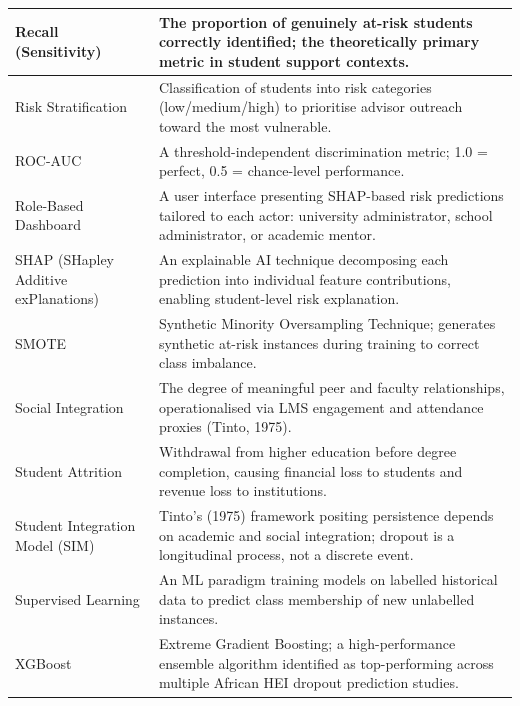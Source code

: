 \documentclass[12pt]{report}
\begin{document}
\begin{center}
\begin{longtable}{|L{3.8cm}|L{10cm}|}
 Recall (Sensitivity) & The proportion of genuinely at-risk students correctly identified; the theoretically primary metric in student support contexts. \\ \hline
{} Risk Stratification & Classification of students into risk categories (low/medium/high) to prioritise advisor outreach toward the most vulnerable. \\ \hline
{} ROC-AUC & A threshold-independent discrimination metric; 1.0 = perfect, 0.5 = chance-level performance. \\ \hline
{} Role-Based Dashboard & A user interface presenting SHAP-based risk predictions tailored to each actor: university administrator, school administrator, or academic mentor. \\ \hline
{} SHAP (SHapley Additive exPlanations) & An explainable AI technique decomposing each prediction into individual feature contributions, enabling student-level risk explanation. \\ \hline
{} SMOTE & Synthetic Minority Oversampling Technique; generates synthetic at-risk instances during training to correct class imbalance. \\ \hline
{} Social Integration & The degree of meaningful peer and faculty relationships, operationalised via LMS engagement and attendance proxies (Tinto, 1975). \\ \hline
{} Student Attrition & Withdrawal from higher education before degree completion, causing financial loss to students and revenue loss to institutions. \\ \hline
{} Student Integration Model (SIM) & Tinto's (1975) framework positing persistence depends on academic and social integration; dropout is a longitudinal process, not a discrete event. \\ \hline
{} Supervised Learning & An ML paradigm training models on labelled historical data to predict class membership of new unlabelled instances. \\ \hline
{} XGBoost & Extreme Gradient Boosting; a high-performance ensemble algorithm identified as top-performing across multiple African HEI dropout prediction studies. \\ \hline
\end{longtable}
\end{center}
\newpage
\end{document}
